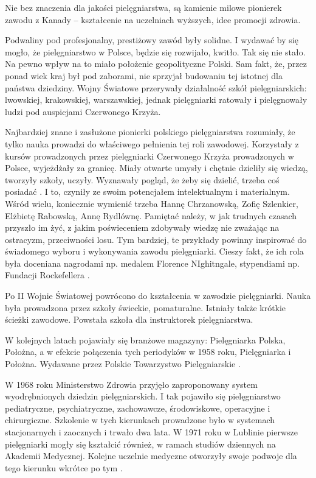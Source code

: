 \documentclass[a4paper,12pt,twoside,openany]{report}
\begin{document}
Nie bez znaczenia dla jakości pielęgniarstwa, są kamienie milowe pionierek zawodu z Kanady – kształcenie na uczelniach wyższych, idee promocji zdrowia.

Podwaliny pod profesjonalny, prestiżowy zawód były solidne. I wydawać by się mogło, że pielęgniarstwo w Polsce, będzie się rozwijało, kwitło. Tak się nie stało. Na pewno wpływ na to miało położenie geopolityczne Polski. Sam fakt, że, przez ponad wiek kraj był pod zaborami, nie sprzyjał budowaniu tej istotnej dla państwa dziedziny. Wojny Światowe przerywały działalność szkół pielęgniarskich: lwowskiej, krakowskiej, warszawskiej, jednak pielęgniarki ratowały i pielęgnowały ludzi pod auspicjami Czerwonego Krzyża.

Najbardziej znane i zasłużone pionierki polskiego pielęgniarstwa rozumiały, że tylko nauka prowadzi do właściwego pełnienia tej roli zawodowej. Korzystały z kursów prowadzonych przez pielęgniarki Czerwonego Krzyża prowadzonych w Polsce, wyjeżdżały za granicę. Miały otwarte umysły i chętnie dzieliły się wiedzą, tworzyły szkoły, uczyły.  Wyznawały pogląd, że żeby się dzielić, trzeba coś posiadać \cite{ikonpol}. I to, czyniły ze swoim potencjałem intelektualnym i materialnym. Wśród wielu, koniecznie wymienić trzeba Hannę Chrzanowską, Zofię Szlenkier, Elżbietę Rabowską, Annę Rydlównę. Pamiętać należy, w jak trudnych czasach przyszło im żyć, z jakim poświeceniem zdobywały wiedzę nie zważając na ostracyzm, przeciwności losu. Tym bardziej, te przykłady powinny inspirować do świadomego wyboru i wykonywania zawodu pielęgniarki. Cieszy fakt, że ich rola była doceniana nagrodami np. medalem Florence NIghitngale, stypendiami np. Fundacji Rockefellera \cite{50}.

Po II Wojnie Światowej powrócono do kształcenia w zawodzie pielęgniarki. Nauka była prowadzona przez szkoły świeckie, pomaturalne. Istniały także krótkie ścieżki zawodowe. Powstała szkoła dla instruktorek pielęgniarstwa.

W kolejnych latach pojawiały się branżowe magazyny: Pielęgniarka Polska, Położna, a w efekcie połączenia tych periodyków w 1958 roku, Pielęgniarka i Położna. Wydawane przez Polskie Towarzystwo Pielęgniarskie \cite{czas}.

W 1968 roku Ministerstwo Zdrowia przyjęło zaproponowany system wyodrębnionych dziedzin pielęgniarskich. I tak pojawiło się pielęgniarstwo pediatryczne, psychiatryczne, zachowawcze, środowiskowe, operacyjne i chirurgiczne. Szkolenie w tych kierunkach prowadzone było w systemach stacjonarnych i zaocznych i trwało dwa lata. W 1971 roku w Lublinie pierwsze pielęgniarki mogły się kształcić również, w ramach studiów dziennych na Akademii Medycznej. Kolejne uczelnie medyczne otworzyły swoje podwoje dla tego kierunku wkrótce po tym \cite{spec}.
 
\end{document}
